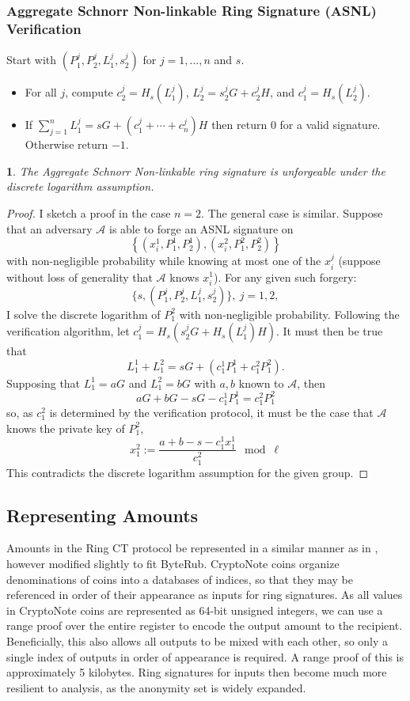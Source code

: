 \documentclass[12pt,oneside,english]{amsart}
\numberwithin{equation}{section}
\numberwithin{figure}{section}
\theoremstyle{plain}
\newtheorem{thm}{\protect\theoremname}
\theoremstyle{plain}
\theoremstyle{remark}
\theoremstyle{plain}
\theoremstyle{remark}
\theoremstyle{remark}
\theoremstyle{plain}
\theoremstyle{definition}
\providecommand{\theoremname}{Theorem}
\begin{document}
\subsubsection{ Aggregate Schnorr Non-linkable Ring Signature (ASNL) Verification}
Start with $(P_1^j, P_2^j, L_1^j, s_2^j)$ for $j=1,...,n$ and $s$. 
\begin{itemize}
 \item For all $j$, compute $c_2^j = H_s (L_1^j)$, $L_2^j = s_2^j G + c_2^j H$, and $c_1^j = H_s(L_2^j)$. 
 \item If $\sum_{j=1}^n L_1^j = s G + (c_1^j + \cdots + c_n^j) H$ then return $0$ for a valid signature.  Otherwise return $-1$. 
\end{itemize}
 \begin{thm}
 The Aggregate Schnorr Non-linkable ring signature is unforgeable under the discrete logarithm assumption.  
 \end{thm}
\begin{proof}
 I sketch a proof in the case $n=2$. The general case is similar. Suppose that an adversary $\mathcal{A}$ is able to forge an ASNL signature on 
\[
  \left\{ (x_i^1, P_1^1, P_2^1), (x_i^2, P_1^2, P_2^2) \right\}
 \]
 with non-negligible probability while knowing at most one of the $x_i^j$ (suppose without loss of generality that $\mathcal{A}$ knows $x_i^1$). For any given such forgery:
 \[
  \{s,(P_1^j, P_2^j, L_1^j, s_2^j)\},\ j=1,2,
 \]
I solve the discrete logarithm of $P_1^2$ with non-negligible probability. Following the verification algorithm, let $c_1^j = H_s\left(s_2^j G + H_s(L_1^j)H\right)$. It must then be true that 
\[
 L_1^1 + L_1^2 = sG + \left(c_1^1 P_1^1 + c_1^2 P_1^2\right).
\]
Supposing that $L_1^1 = a G$ and $L_1^2 = bG$ with $a,b$ known to $\mathcal{A}$, then 
\[ 
 aG + bG - sG - c_1^1 P_1^1 = c_1^2 P_1^2
\]
so, as $c_1^2$ is determined by the verification protocol, it must be the case that $\mathcal{A}$ knows the private key of $P_1^2$, 
\[
 x_1^2 := \frac{a+b-s-c_1^1 x_1^1}{c_1^2} \mod \ell
\]
 This contradicts the discrete logarithm assumption for the given group. 
\end{proof}
\subsection{Representing Amounts }
Amounts in the Ring CT protocol be represented in a similar manner as in \cite{GM}, however modified slightly to fit ByteRub.
CryptoNote coins organize denominations of coins into a databases of indices, so that they may be referenced in order of their appearance as inputs for ring signatures. As all values in CryptoNote coins are represented as 64-bit unsigned integers, we can use a range proof over the entire register to encode the output amount to the recipient. Beneficially, this also allows all outputs to be mixed with each other, so only a single index of outputs in order of appearance is required. A range proof of this is approximately 5 kilobytes. Ring signatures for inputs then become much more resilient to analysis, as the anonymity set is widely expanded.
\end{document}
